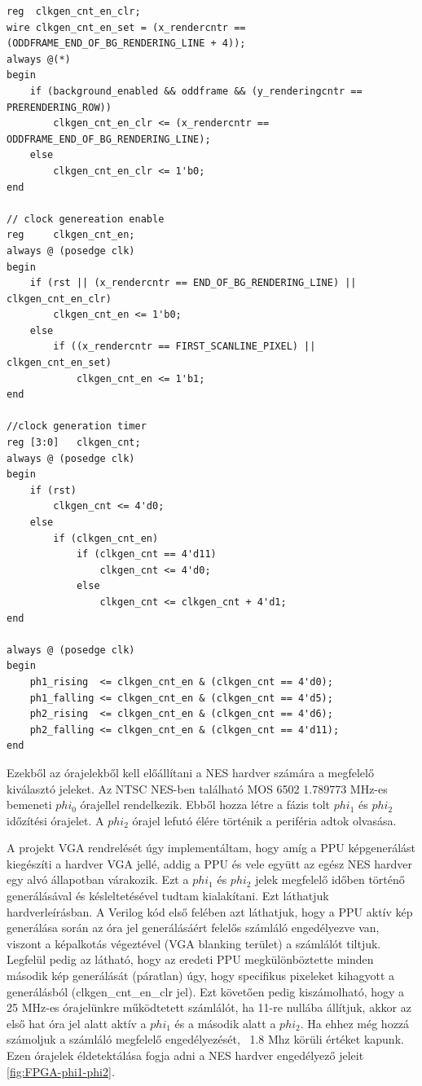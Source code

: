 \begin{lstlisting}[caption={6502 $phi_1$ és $phi_2$ vezérlő jelek előállítása}, label={code:6502-clocksignals}, style=prettyverilog]
reg  clkgen_cnt_en_clr;
wire clkgen_cnt_en_set = (x_rendercntr == (ODDFRAME_END_OF_BG_RENDERING_LINE + 4));
always @(*) 
begin
	if (background_enabled && oddframe && (y_renderingcntr == PRERENDERING_ROW))
		clkgen_cnt_en_clr <= (x_rendercntr == ODDFRAME_END_OF_BG_RENDERING_LINE);
	else
		clkgen_cnt_en_clr <= 1'b0;	
end

// clock genereation enable
reg		clkgen_cnt_en;
always @ (posedge clk)
begin
	if (rst || (x_rendercntr == END_OF_BG_RENDERING_LINE) || clkgen_cnt_en_clr)
		clkgen_cnt_en <= 1'b0;
	else
		if ((x_rendercntr == FIRST_SCANLINE_PIXEL) || clkgen_cnt_en_set)
			clkgen_cnt_en <= 1'b1;
end	

//clock generation timer
reg	[3:0]	clkgen_cnt;
always @ (posedge clk)
begin
	if (rst)
		clkgen_cnt <= 4'd0;
	else
		if (clkgen_cnt_en)
			if (clkgen_cnt == 4'd11)
				clkgen_cnt <= 4'd0;
			else
				clkgen_cnt <= clkgen_cnt + 4'd1;
end

always @ (posedge clk)
begin
	ph1_rising	<= clkgen_cnt_en & (clkgen_cnt == 4'd0);
	ph1_falling <= clkgen_cnt_en & (clkgen_cnt == 4'd5);
	ph2_rising	<= clkgen_cnt_en & (clkgen_cnt == 4'd6);
	ph2_falling <= clkgen_cnt_en & (clkgen_cnt == 4'd11);
end\end{lstlisting}

Ezekből az órajelekből kell előállítani a NES hardver számára a megfelelő kiválasztó jeleket. Az NTSC NES-ben található MOS 6502 1.789773 MHz-es bemeneti $phi_0$ órajellel rendelkezik. Ebből hozza létre a fázis tolt $phi_1$ és $phi_2$ időzítési órajelet. A $phi_2$ órajel lefutó élére történik a periféria adtok olvasása. 

A projekt VGA rendrelését úgy implementáltam, hogy amíg a PPU képgenerálást kiegészíti a hardver VGA jellé, addig a PPU és vele együtt az egész NES hardver egy alvó állapotban várakozik. Ezt a $phi_1$ és $phi_2$ jelek megfelelő időben történő generálásával és késleltetésével tudtam kialakítani. Ezt láthatjuk  hardverleírásban. A Verilog kód első felében azt láthatjuk, hogy a PPU aktív kép generálása során az óra jel generálásáért felelős számláló engedélyezve van, viszont a képalkotás végeztével (VGA blanking terület) a számlálót tiltjuk. Legfelül pedig az látható, hogy az eredeti PPU megkülönböztette minden második kép generálását (páratlan) úgy, hogy specifikus pixeleket kihagyott a generálásból (clkgen\_cnt\_en\_clr jel). Ezt követően pedig kiszámolható, hogy a 25 MHz-es órajelünkre működtetett számlálót, ha 11-re nullába állítjuk, akkor az első hat óra jel alatt aktív a $phi_1$ és a második alatt a $phi_2$. Ha ehhez még hozzá számoljuk a számláló megfelelő engedélyezését, ~1.8 Mhz körüli értéket kapunk. Ezen órajelek éldetektálása fogja adni a NES hardver engedélyező jeleit \ref{fig:FPGA-phi1-phi2}.

